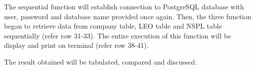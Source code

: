 The sequential function will establish connection to PostgreSQL database with user, password and database name provided once again. Then, the three function began to retrieve data from company table, LEO table and NSPL table sequentially (refer row 31-33). The entire execution of this function  will be display and print on terminal (refer row 38-41). 

The result obtained will be tabulated, compared and discussed.








